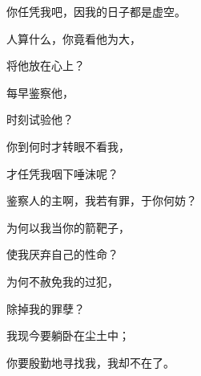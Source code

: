 {\par }{\Q 你任凭我吧，因我的日子都是虚空。
\par }{\Q {}人算什么，你竟看他为大，
\par }{\Q 将他放在心上？
\par }{\Q {}每早鉴察他，
\par }{\Q 时刻试验他？
\par }{\Q {}你到何时才转眼不看我，
\par }{\Q 才任凭我咽下唾沫呢？
\par }{\Q {}鉴察人的主啊，我若有罪，于你何妨？
\par }{\Q 为何以我当你的箭靶子，
\par }{\Q 使我厌弃自己的性命？
\par }{\Q {}为何不赦免我的过犯，
\par }{\Q 除掉我的罪孽？
\par }{\Q 我现今要躺卧在尘土中；
\par }{\Q 你要殷勤地寻找我，我却不在了。

}
